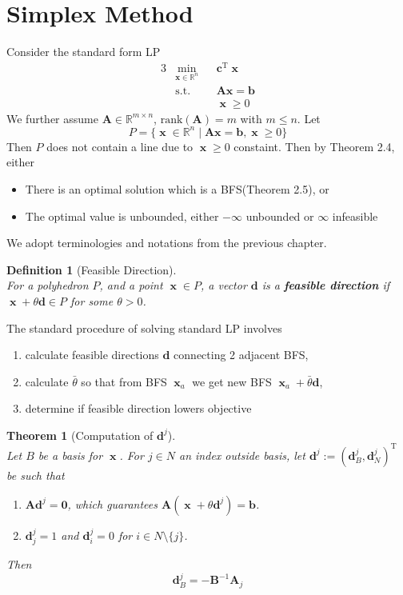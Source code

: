 \documentclass[12pt]{article}
\newcommand{\rank}{\mathrm{rank}}
\newcommand{\st}{\mathrm{s.t.}}
\newcommand{\T}{\mathrm{T}}
\newtheorem{definition}{Definition}[section]
\newtheorem{theorem}{Theorem}[section]
\theoremstyle{definition}
\DeclareMathOperator{\x}{\mathbf{x}}
\begin{document}
\section{Simplex Method}
Consider the standard form LP
\begin{alignat*}{3}
&\min_{\mathbf{x}\in\mathbb{R}^n}&& \mathbf{c}^\T\x\\
&\st&&\mathbf{Ax}=\mathbf{b}\\
&&&\x\geq 0
\end{alignat*}
We further assume $\mathbf{A}\in\mathbb{R}^{m\times n}$, $\rank(\mathbf{A})=m$ with $m\leq n$. Let
\[
P=\{\x\in\mathbb{R}^n\mid \mathbf{Ax}=\mathbf{b}, \x\geq 0\}
\]
Then $P$ does not contain a line due to $\x\geq 0$ constaint. Then by Theorem 2.4, either
\begin{itemize}
\item There is an optimal solution which is a BFS(Theorem 2.5), or
\item The optimal value is unbounded, either $-\infty$ unbounded or $\infty$ infeasible
\end{itemize}
We adopt terminologies and notations from the previous chapter.
\begin{definition}[Feasible Direction]
\hfill\\\normalfont For a polyhedron $P$, and a point $\x\in P$, a vector $\mathbf{d}$ is a \textbf{feasible direction} if $\x+\theta\mathbf{d}\in P$ for some $\theta>0$.
\end{definition}
The standard procedure of solving standard LP involves
\begin{enumerate}
  \item calculate feasible directions $\mathbf{d}$ connecting 2 adjacent BFS,
  \item calculate $\bar{\theta}$ so that from BFS $\x_a$ we get new BFS $\x_a+\bar{\theta}\mathbf{d}$,
  \item determine if feasible direction lowers objective
\end{enumerate}
\begin{theorem}[Computation of {$\mathbf{d}^j$}]
\hfill\\\normalfont Let $B$ be a basis for $\x$. For $j\in N$ an index outside basis, let $\mathbf{d}^j:=(\mathbf{d}_B^j, \mathbf{d}_N^j)^\T$ be such that
\begin{enumerate}
  \item $\mathbf{Ad}^j=\mathbf{0}$, which guarantees $\mathbf{A}(\x+\theta\mathbf{d}^j)=\mathbf{b}$.
  \item $\mathbf{d}_j^j=1$ and $\mathbf{d}^j_i=0$ for $i\in N\setminus\{j\}$.
\end{enumerate}
Then 
\[
\mathbf{d}^j_B = -\mathbf{B}^{-1}\mathbf{A}_j
\]
\end{theorem}
\end{document}
